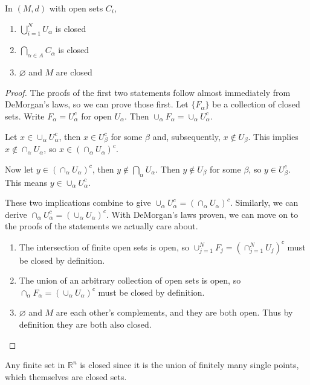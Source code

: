 \documentclass[10pt]{report}
\begin{document}
\begin{prop}
        In $(M,d)$ with open sets $C_i$,
        \begin{enumerate}
                \item $\bigcup_{i=1}^N U_\alpha$ is closed
                \item $\bigcap_{\alpha\in A} C_\alpha$ is closed
                \item $\varnothing$ and $M$ are closed
        \end{enumerate}
\end{prop}
\begin{proof}
	The proofs of the first two statements follow almost immediately from DeMorgan's laws, so we can prove those first. Let $\{F_\alpha\}$ be a collection of closed sets. Write $F_\alpha=U_\alpha^c$ for open $U_\alpha$. Then $\cup_\alpha F_\alpha =\cup_\alpha U_\alpha^c$.

	Let $x \in \cup_\alpha U_\alpha^c$, then $x\in U_\beta^c$ for some $\beta$ and, subsequently, $x \not\in U_\beta$. This implies $x \not\in \cap_\alpha U_\alpha$, so $x \in \left( \cap_\alpha U_\alpha \right)^c$.

	Now let $y \in \left( \cap_\alpha U_\alpha \right)^c$, then $y \not\in \bigcap_\alpha U_\alpha$. Then $y \not\in U_\beta$ for some $\beta$, so $y \in U_\beta^c$. This means $y \in \cup_\alpha U_\alpha^c$.

	These two implications combine to give $\cup_\alpha U_\alpha^c = \left( \cap_\alpha U_\alpha \right)^c$. Similarly, we can derive $\cap_\alpha U_\alpha^c = \left( \cup_\alpha U_\alpha \right)^c$. With DeMorgan's laws proven, we can move on to the proofs of the statements we actually care about.

	\begin{enumerate}
		\item The intersection of finite open sets is open, so $\cup_{j=1}^N F_j = \left( \cap_{j=1}^N U_j \right)^c$ must be closed by definition.
		\item The union of an arbitrary collection of open sets is open, so $\cap_\alpha F_\alpha = \left( \cup_\alpha U_\alpha \right)^c$ must be closed by definition.
		\item $\varnothing$ and $M$ are each other's complements, and they are both open. Thus by definition they are both also closed.
	\end{enumerate}

\end{proof}

\begin{ex}{}{}
Any finite set in $\mathbb{R}^n$ is closed since it is the union of finitely many single points, which themselves are closed sets.
\end{ex}
\end{document}
